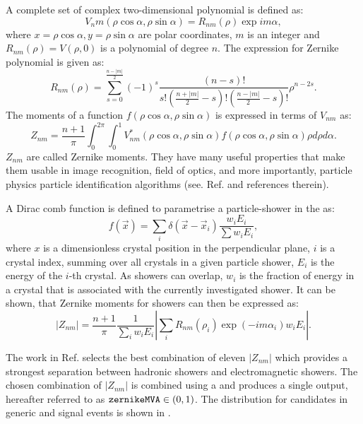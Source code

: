A complete set of complex two-dimensional polynomial is defined as:
\begin{equation}
    V_nm(\rho\cos\alpha,\rho\sin\alpha) = R_{nm}(\rho)\exp{im\alpha},
\end{equation}
where ${x=\rho\cos\alpha, y=\rho\sin\alpha}$ are polar coordinates, $m$ is an integer and $R_{nm}(\rho)=V(\rho,0)$ is a polynomial of degree $n$.
The expression for Zernike polynomial is given as:
\begin{equation}
    R_{nm}(\rho) = \sum^{\frac{n-|m|}{2}}_{s=0}(-1)^s \frac{(n-s)!}{ s! \left(\frac{n+|m|}{2}-s \right) ! \left( \frac{n-|m|}{2}-s\right) !}\rho^{n-2s}.
\end{equation}
The moments of a function $f(\rho\cos\alpha,\rho\sin\alpha)$ is expressed in terms of $V_{nm}$ as:
\begin{equation}
    Z_{nm} = \frac{n+1}{\pi} \int_0^{2\pi}\int^1_0 V^*_{nm}(\rho\cos\alpha,\rho\sin\alpha)f(\rho\cos\alpha, \rho\sin\alpha)\rho d\rho d\alpha.
\end{equation}
$Z_{nm}$ are called Zernike moments.
They have many useful properties that make them usable in image recognition, field of optics, and more importantly, particle physics particle identification algorithms (see. Ref.\cite{Hershenhorn:2468} and references therein).

A Dirac comb function is defined to parametrise a particle-shower in the \ECL as:
\begin{equation}
    f(\vec{x}) = \sum_i \delta(\vec{x}-\vec{x}_i)\frac{w_iE_i}{\sum w_iE_i},
\end{equation}
where $x$ is a dimensionless crystal position in the perpendicular plane, $i$ is a crystal index, summing over all crystals in a given particle shower, $E_i$ is the energy of the $i$-th crystal.
As showers can overlap, $w_i$ is the fraction of energy in a crystal that is associated with the currently investigated shower.
It can be shown, that Zernike moments for \ECL showers can then be expressed as:
\begin{equation}
    |Z_{nm}| = \frac{n+1}{\pi}\frac{1}{\sum_iw_iE_i}\left|\sum_iR_{nm}(\rho_i)\exp(-im\alpha_i)w_iE_i\right|.
\end{equation}

The work in Ref.\cite{Hershenhorn:2468} selects the best combination of eleven $|Z_{nm}|$ which provides a strongest separation between hadronic showers and electromagnetic showers.
The chosen combination of $|Z_{nm}|$ is combined using a \BDT and produces a single output, hereafter referred to as ${\texttt{zernikeMVA}}\in(0,1)$.
The \ZMVA distribution for \BtoXsgamma candidates in generic \MC and signal \MC events is shown in .

